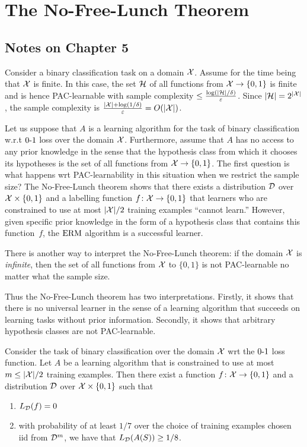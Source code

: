 \chapter{The No-Free-Lunch Theorem}

\section*{Notes on Chapter 5}

Consider a binary classification task on a domain $\mathcal{X}$. Assume for the time
being that $\mathcal{X}$ is finite. In this case, the set $\mathcal{H}$ of all functions
from $\mathcal{X} \rightarrow \{0, 1\}$ is finite and is hence PAC-learnable with
sample complexity $\leq \frac{\log (|\mathcal{H}| / \delta)}{\varepsilon}$.  Since
$|\mathcal{H}| = 2^{|\mathcal{X}|}$, the sample complexity is $\frac{|\mathcal{X}| + \log (1 /
\delta)}{\varepsilon} = O(|\mathcal{X}|)$.

Let us suppose that $A$ is a learning algorithm for the task of binary
classification w.r.t $\operatorname{0-1}$ loss over the domain $\mathcal{X}$. Furthermore, assume
that $A$ has no access to any prior knowledge in the sense that the hypothesis
class from which it chooses its hypotheses is the set of all functions from
$\mathcal{X} \rightarrow \{0, 1\}$.
The first question is what happens wrt PAC-learnability in this situation when
we restrict the sample size? The No-Free-Lunch theorem shows that there exists
a distribution $\mathcal{D}$ over $\mathcal{X} \times \{0, 1\}$ and a labelling function $f
\colon \mathcal{X} \rightarrow \{0, 1\}$ that learners who are  constrained to use at
most $|\mathcal{X}| / 2$ training examples ``cannot learn.'' However, given specific prior
knowledge in the form of a hypothesis class that contains this function~$f$, the
$\operatorname{ERM}$ algorithm is a successful learner.


There is another way to interpret the No-Free-Lunch theorem: if the domain
$\mathcal{X}$ is \emph{infinite}, then the set of all functions from $\mathcal{X}$ to
$\{0, 1\}$ is not PAC-learnable no matter what the sample size.

Thus the No-Free-Lunch theorem has two interpretations. Firstly, it shows that there
is no universal learner in the sense of a learning algorithm that succeeds on
learning tasks without prior information. Secondly, it shows that arbitrary hypothesis
classes are not PAC-learnable.


\begin{theorem}
\label{thm:no_free_lunch}
Consider the task of binary classification over the domain $\mathcal{X}$ wrt the $\operatorname{0-1}$
loss function. Let $A$ be a learning algorithm that is constrained to use at
most $m \leq |\mathcal{X}| / 2$ training examples. Then there exist
a function $f \colon \mathcal{X} \rightarrow \{0, 1\}$ and a distribution
$\mathcal{D}$ over $\mathcal{X} \times \{0, 1\}$ such that
\begin{enumerate}
    \item $L_{\mathcal{D}} (f) = 0$
    \item with probability of at least $1/7$ over the choice of training examples
        chosen iid from $\mathcal{D}^{m}$, we have that $L_{\mathcal{D}} (A(S)) \geq 1/ 8$.
\end{enumerate}
\end{theorem}



